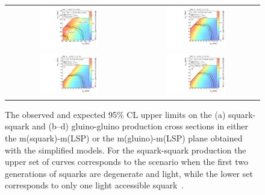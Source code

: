 \begin{figure}[!hp]
  \centering
  \begin{tabular}{cc}
                \includegraphics[width=0.49\textwidth]{figures/RA2_Limit1.pdf} &
                \includegraphics[width=0.49\textwidth]{figures/RA2_Limit2.pdf} \\
                \includegraphics[width=0.49\textwidth]{figures/RA2_Limit3.pdf} &
                \includegraphics[width=0.49\textwidth]{figures/RA2_Limit4.pdf} \\
  \end{tabular}
\caption{The observed and expected 95\% CL upper limits on the (a) squark-squark and (b--d) gluino-gluino production cross sections in either the m(squark)-m(LSP) or the m(gluino)-m(LSP) plane obtained with the simplified models. For the squark-squark production the upper set of curves corresponds to the scenario when the first two generations of squarks are degenerate and light, while the lower set corresponds to only one light accessible squark~\cite{Chatrchyan:2014lfa}.} 
  \label{fig:ra2_limits}
\end{figure}
